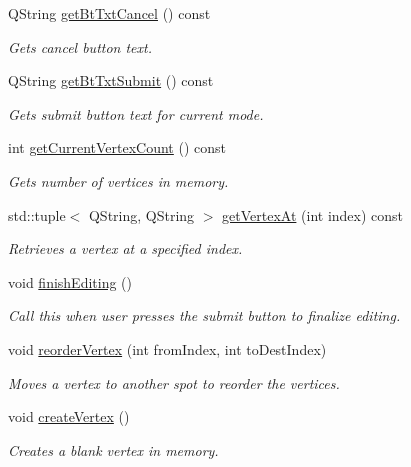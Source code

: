 \begin{DoxyCompactItemize}
Q\+String \mbox{\hyperlink{class_v_m_editor_vertices_a0db2a882a7334d63902bbb5e93745efe}{get\+Bt\+Txt\+Cancel}} () const
\begin{DoxyCompactList}\small\item\em Gets cancel button text. \end{DoxyCompactList}\item 
Q\+String \mbox{\hyperlink{class_v_m_editor_vertices_added9bc98a3854b9639ea4f1e4c58e25}{get\+Bt\+Txt\+Submit}} () const
\begin{DoxyCompactList}\small\item\em Gets submit button text for current mode. \end{DoxyCompactList}\item 
int \mbox{\hyperlink{class_v_m_editor_vertices_ac126c0b810f29c803f54cea4a50b6953}{get\+Current\+Vertex\+Count}} () const
\begin{DoxyCompactList}\small\item\em Gets number of vertices in memory. \end{DoxyCompactList}\item 
std\+::tuple$<$ Q\+String, Q\+String $>$ \mbox{\hyperlink{class_v_m_editor_vertices_a1fce7e9467a432c63700f889ab8d6d59}{get\+Vertex\+At}} (int index) const
\begin{DoxyCompactList}\small\item\em Retrieves a vertex at a specified index. \end{DoxyCompactList}\item 
void \mbox{\hyperlink{class_v_m_editor_vertices_a3dafad61c61cfd7b90d2e1651daa79be}{finish\+Editing}} ()
\begin{DoxyCompactList}\small\item\em Call this when user presses the submit button to finalize editing. \end{DoxyCompactList}\item 
void \mbox{\hyperlink{class_v_m_editor_vertices_a33f91a61158bbac2b540ca80ac75eaf1}{reorder\+Vertex}} (int from\+Index, int to\+Dest\+Index)
\begin{DoxyCompactList}\small\item\em Moves a vertex to another spot to reorder the vertices. \end{DoxyCompactList}\item 
void \mbox{\hyperlink{class_v_m_editor_vertices_a990cf169787aa12ee32aebde378b99f8}{create\+Vertex}} ()
\begin{DoxyCompactList}\small\item\em Creates a blank vertex in memory. \end{DoxyCompactList}\item 

\end{DoxyCompactItemize}
